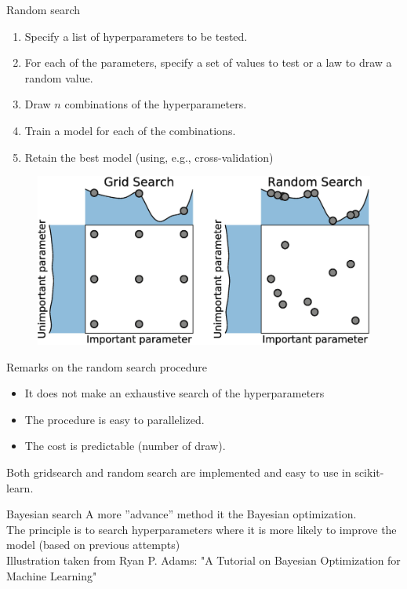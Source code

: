 \documentclass[handout]{beamer}
\begin{document}
\begin{frame}{Random search}
    \begin{enumerate}
    \item Specify a list of hyperparameters to be tested.
    \item For each of the parameters, specify a set of values to test or a law to draw a random value.
    \item Draw $n$ combinations of the hyperparameters.
    \item Train a model for each of the combinations.
    \item Retain the best model (using, e.g., cross-validation)
\end{enumerate}
\begin{figure}
    \centering
    \includegraphics[width=.7\textwidth]{fig/L2/cIDuR2.png}
\end{figure}
\end{frame}

\begin{frame}{Remarks on the random search procedure}

\begin{itemize}
    \item It \alert{does not make} an \alert{exhaustive} search of the hyperparameters
    \item The procedure is easy to \alert{parallelized}.
    \item The cost is predictable (number of draw).
\end{itemize}
\pause
Both gridsearch and random search are implemented and easy to use in scikit-learn.
\end{frame}


\begin{frame}{Bayesian search}
A more ''advance'' method it the \alert{Bayesian} optimization.\\
\vspace{1em}
The principle is to search hyperparameters where it is more likely to improve the model (based on previous attempts)\\
\vspace{1em}
Illustration taken from Ryan P. Adams: "A Tutorial on Bayesian Optimization for Machine Learning"
    
    
\end{frame}
\end{document}
